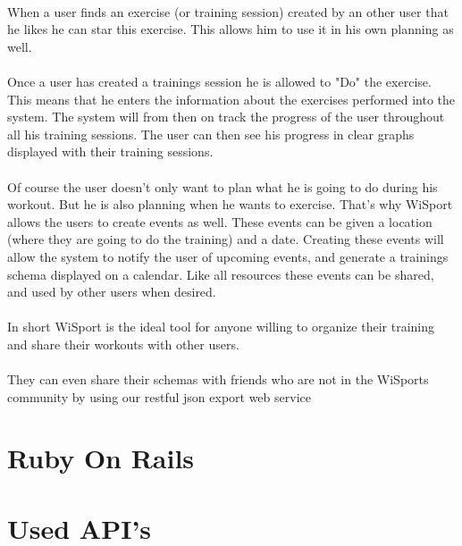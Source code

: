 \documentclass[11pt,a4paper]{scrartcl}
\begin{document}
\paragraph{}When a user finds an exercise (or training session) created by an other user that he likes he can star this exercise. This allows him to use it in his own planning as well.
\paragraph{}Once a user has created a trainings session he is allowed to "Do" the exercise. This means that he enters the information about the exercises performed into the system. The system will from then on track the progress of the user throughout all his training sessions. The user can then see his progress in clear graphs displayed with their training sessions.
\paragraph{}Of course the user doesn't only want to plan what he is going to do during his workout. But he is also planning when he wants to exercise. That's why WiSport allows the users to create events as well. These events can be given a location (where they are going to do the training) and a date. Creating these events will allow the system to notify the user of upcoming events, and generate a trainings schema displayed on a calendar. Like all resources these events can be shared, and used by other users when desired.
\paragraph{}In short WiSport is the ideal tool for anyone willing to organize their training and share their workouts with other users.
\paragraph{}They can even share their schemas with friends who are not in the WiSports community by using our restful json export web service

\section{Ruby On Rails}


\section{Used API's}
\end{document}
